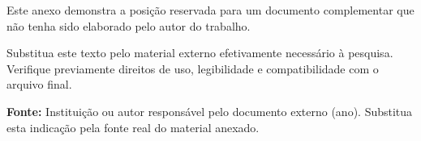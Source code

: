 \label{an:external-document}

Este anexo demonstra a posição reservada para um documento complementar que não tenha sido elaborado pelo autor do trabalho.

Substitua este texto pelo material externo efetivamente necessário à pesquisa. Verifique previamente direitos de uso, legibilidade e compatibilidade com o arquivo final.

\noindent\textbf{Fonte:} Instituição ou autor responsável pelo documento externo (ano). Substitua esta indicação pela fonte real do material anexado.
